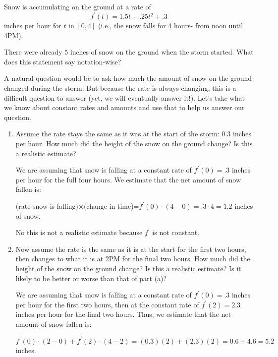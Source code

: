 \documentclass[nooutcomes,handout]{ximera}
\begin{document}
\begin{problem}
  Snow is accumulating on the ground at a rate of  
  $$f^\prime (t)=1.5t-.25 t^2+.3$$
  inches per hour for $t$ in $[0,4]$ (i.e., the snow falls for 4 hours- from noon until 4PM).  

  There were already $5$ inches of snow on the ground when the storm started.  What does this statement say notation-wise?

  A natural question would be to ask how much the amount of snow on the ground changed during the storm.  But because the rate is always changing, this is a difficult question to answer (yet, we will eventually answer it!).  Let’s take what we know about constant rates and amounts and use that to help us answer our question.

  \begin{enumerate}
    
  \item  Assume the rate stays the same as it was at the start of the storm: 0.3 inches per hour.  How much did the height of the snow on the ground change?  Is this a realistic estimate?
    \begin{freeResponse}
      We are assuming that snow is falling at a constant rate of $f^\prime (0)=.3$ inches per hour for the full four hours.  We estimate that the net amount of snow fallen is:
      
      (rate snow is falling)$\times$(change in time)=$f^\prime (0) \cdot (4-0) =.3 \cdot 4=1.2$ inches of snow.  
      
      No this is not a realistic estimate because $f^\prime$ is not constant.
    \end{freeResponse}

  \item  Now assume the rate is the same as it is at the start for the first two hours, then changes to what it is at 2PM for the final two hours.  How much did the height of the snow on the ground change?  Is this a realistic estimate?  Is it likely to be better or worse than that of part (a)?
    \begin{freeResponse}
      We are assuming that snow is falling at a constant rate of $f^\prime (0)=.3$ inches per hour for the first two hours, then at the constant rate of $f^\prime (2)=2.3$ inches per hour for the final two hours.  Thus, we estimate that the net amount of snow fallen is:
      
      $f^\prime (0)\cdot (2-0)+ f^\prime (2) \cdot (4-2)= (0.3)(2) + (2.3)(2) = 0.6+4.6=5.2$ inches.
      

\end{freeResponse}
\end{enumerate}
\end{problem}
\end{document}
